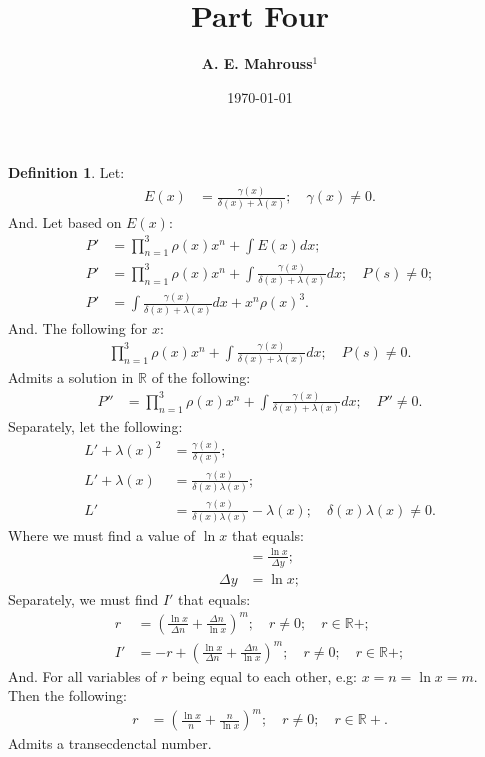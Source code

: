 \documentclass[10pt]{article}
\title{%
  \vspace{-1.5em}%
  \large\textbf{Part Four}%
}
\author{%
  \textbf{A. E. Mahrouss}$^{1}$
}
\date{%
  \small \today
}
\theoremstyle{plain}
\theoremstyle{definition}
\newtheorem{definition}[theorem]{Definition}
\theoremstyle{remark}
\begin{document}


\begin{definition}
	Let:
	\begin{align*}
		E(x) &= \frac{\gamma(x)}{\delta(x) + \lambda(x)}; \quad \gamma(x) \neq 0.
	\end{align*}
	And. Let based on $E(x)$:
	\begin{align*}
		P' &= \prod_{n=1}^{3}\rho(x) x^{n} + \int E(x) dx;\\
		P' &= \prod_{n=1}^{3}\rho(x) x^{n} + \int \frac{\gamma(x)}{\delta(x) + \lambda(x)} dx; \quad P(s) \neq 0;\\
		P' &= \int \frac{\gamma(x)}{\delta(x) + \lambda(x)} dx + x^{n} \rho(x)^{3}.
	\end{align*}
	And. The following for $x$:
	\begin{align*}
		\prod_{n=1}^{3}\rho(x) x^{n} + \int \frac{\gamma(x)}{\delta(x) + \lambda(x)} dx; \quad P(s) \neq 0.
	\end{align*}
	Admits a solution in $\mathbb{R}$ of the following:
	\begin{align*}
		P'' &= \prod_{n=1}^{3}\rho(x) x^{n} + \int \frac{\gamma(x)}{\delta(x) + \lambda(x)} dx; \quad P'' \neq 0.
	\end{align*}
	Separately, let the following:
	\begin{align*}
		L' + \lambda(x)^{2} &= \frac{\gamma(x)}{\delta(x)};\\
	 	L' + \lambda(x) &= \frac{\gamma(x)}{\delta(x)  \lambda(x) };\\
	 	L' &= \frac{\gamma(x)}{\delta(x)  \lambda(x) } - \lambda(x); \quad \delta(x)\lambda(x) \neq 0.
	\end{align*}
	Where we must find a value of $\ln x$ that equals:
	\begin{align*}
		&= \frac{\ln x}{\Delta y};\\
		\Delta y &= \ln x;
	\end{align*}
	Separately, we must find $I'$ that equals:
	\begin{align*}
		r &= ( \frac{\ln x}{\Delta n} + \frac{\Delta n}{\ln x})^m; \quad r \neq 0; \quad r \in \mathbb{R}{+};\\
		I' &= - r + ( \frac{\ln x}{\Delta n} + \frac{\Delta n}{\ln x})^m; \quad r \neq 0; \quad r \in \mathbb{R}{+};
	\end{align*}
	And. For all variables of $r$ being equal to each other, e.g: $x =n = \ln x = m.$ Then the following:
	\begin{align*}
		r &= ( \frac{\ln x}{n} + \frac{n}{\ln x})^m; \quad r \neq 0; \quad r \in \mathbb{R}{+}.
	\end{align*}
	Admits a transecdenctal number.
\end{definition}
\end{document}

